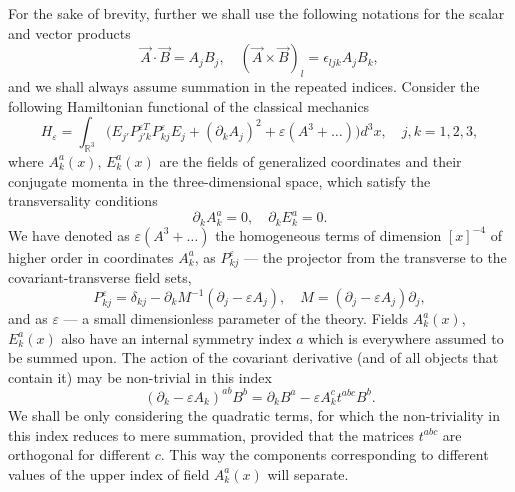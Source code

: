 \documentclass[12pt]{article}
\newcommand{\pl}{\partial}
\newcommand{\RR}{\mathbb{R}}
\newcommand{\ve}{\varepsilon}
\begin{document}
    For the sake of brevity, further we shall use
    the following notations for the scalar and vector products
\begin{equation*}
    \vec{A}\cdot\vec{B} = A_{j}B_{j} ,\quad
	(\vec{A}\times\vec{B})_{l} = \epsilon_{ljk} A_{j} B_{k} ,
\end{equation*}
	and we shall always assume summation in the repeated indices.
	Consider the following Hamiltonian functional of the classical
    mechanics
\begin{equation}
\label{qH3}
    H_{\ve}
    = \int_{\RR^{3}} \bigl(E_{j'}P_{j'k}^{\ve T}P_{kj}^{\ve}
	E_{j} + (\pl_{k} A_{j})^{2}
	+ \ve (A^{3}+\ldots) \bigr) d^{3}x ,\quad j,k= 1,2,3,
\end{equation}
    where
$ A_{k}^{a}(x) $,
$ E_{k}^{a}(x) $ are the fields of generalized coordinates and their
    conjugate momenta in the three-dimensional space, which satisfy
    the transversality conditions
\begin{equation}
\label{transAE}
    \pl_{k} A_{k}^{a} = 0, \quad 
    \pl_{k} E_{k}^{a} = 0 .
\end{equation}
	We have denoted as 
$ \ve (A^{3}+\ldots) $
	the homogeneous terms of dimension
$ [x]^{-4} $
	of higher order in coordinates
$ A_{k}^{a} $,
	as
$ P_{kj}^{\ve} $ --- the projector from the transverse
	to the covariant-transverse field sets,
\begin{equation*}
    P_{kj}^{\ve}
	= \delta_{kj} - \pl_{k} M^{-1} (\pl_{j}-\ve A_{j}),
	\quad M = (\pl_{j} - \ve A_{j}) \pl_{j} ,
\end{equation*}
    and as
$ \ve $ --- a small dimensionless parameter of the theory.
	Fields
$ A_{k}^{a}(x) $,
$ E_{k}^{a}(x) $
	also have an internal symmetry index
$ a $
	which is everywhere assumed to be summed upon.
	The action of the covariant derivative (and of all objects that contain it)
	may be non-trivial in this index
\begin{equation*}
    (\pl_{k}-\ve A_{k})^{ab} B^{b} = \pl_{k} B^{a}
	- \ve A_{k}^{c} t^{abc} B^{b} .
\end{equation*}
	We shall be only considering the quadratic terms, for which the
    non-triviality in this index reduces to mere summation,
	provided that the matrices 
$ t^{abc} $
	are orthogonal for different
$ c $.
    This way the components corresponding to different values of the upper
    index of field
$ A_{k}^{a}(x) $
    will separate.
\end{document}
